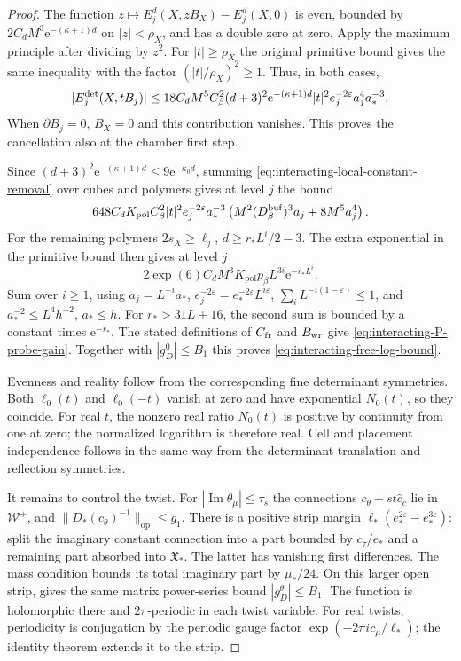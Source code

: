 \begin{proof}
The function
$z\mapsto E_j^d(X,zB_X)-E_j^d(X,0)$ is even,
bounded by $2C_dM^3\mathrm e^{-(\kappa+1)d}$ on
$|z|<\rho_X$, and has a double zero at zero.
Apply the maximum principle after dividing
by $z^2$. For $|t|\ge\rho_X$ the original
primitive bound gives the same inequality
with the factor $(|t|/\rho_X)^2\ge1$.
Thus, in both cases,
\begin{equation}\label{eq:interacting-local-constant-removal}
 |E_j^{\rm det}(X,tB_j)|\le
 18C_dM^5C_\beta^2(d+3)^2\mathrm e^{-(\kappa+1)d}
          |t|^2e_j^{-2\varepsilon}a_j^4a_*^{-3}.
\end{equation}
When $\partial B_j=0$, $B_X=0$ and this contribution
vanishes. This proves the cancellation also
at the chamber first step.

Since $(d+3)^2\mathrm e^{-(\kappa+1)d}\le9\mathrm e^{-\kappa_0d}$,
summing \eqref{eq:interacting-local-constant-removal}
over cubes and polymers gives at level $j$
the bound
\[
 648C_dK_{\mathrm{pol}}C_\beta^2|t|^2e_j^{-2\varepsilon}a_*^{-3}
           \left(M^2(D_\beta^{\rm buf})^3a_j+8M^5a_j^4\right).
\]
For the remaining polymers $2s_X\ge\ell_j$,
$d\ge r_*L^i/2-3$. The extra exponential in
the primitive bound then gives at level $j$
\[
 2\exp(6)C_dM^3K_{\mathrm{pol}}p_\beta L^{3i}\mathrm e^{-r_*L^i}.
\]
Sum over $i\ge1$, using $a_j=L^{-i}a_*$,
$e_j^{-2\varepsilon}=e_*^{-2\varepsilon}L^{i\varepsilon}$,
$\sum_iL^{-i(1-\varepsilon)}\le1$, and
$a_*^{-2}\le L^4h^{-2}$, $a_*\le h$.
For $r_*>31L+16$, the second sum is bounded
by a constant times $\mathrm e^{-r_*}$.
The stated definitions of $C_{\rm fr}$ and
$B_{\rm wr}$ give \eqref{eq:interacting-P-probe-gain}.
Together with $|g_D^0|\le B_1$ this proves
\eqref{eq:interacting-free-log-bound}.

Evenness and reality follow from the corresponding
fine determinant symmetries. Both $\ell_0(t)$
and $\ell_0(-t)$ vanish at zero and have
exponential $N_0(t)$, so they coincide.
For real $t$, the nonzero real ratio $N_0(t)$
is positive by continuity from one at zero;
the normalized logarithm is therefore real.
Cell and placement independence follows in
the same way from the determinant translation
and reflection symmetries.

It remains to control the twist. For
$|\operatorname{Im}\theta_\mu|\le\tau_s$
the connections $c_\theta+st\widehat c_c$
lie in $\mathcal W^+$, and
$\|D_*(c_\theta)^{-1}\|_{\mathrm{op}}\le g_1$.
There is a positive strip margin
$\ell_*(e_*^{2\varepsilon}-e_*^{3\varepsilon})$:
split the imaginary constant connection
into a part bounded by $c_\tau/e_*$ and a
remaining part absorbed into $\mathfrak X_*$.
The latter has vanishing first differences.
The mass condition bounds its total imaginary
part by $\mu_*/24$. On this larger open strip,
\cite[(73)]{TerminalPressure} gives
the same matrix power-series bound $|g_D^\theta|\le B_1$.
The function is holomorphic there and
$2\pi$-periodic in each twist variable.
For real twists, periodicity is conjugation by
the periodic gauge factor
$\exp(-2\pi i c_\mu/\ell_*)$; the identity
theorem extends it to the strip.


\end{proof}

